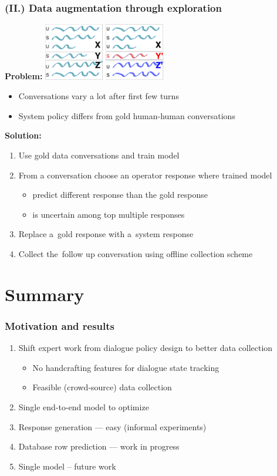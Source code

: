 \documentclass[10pt, compress,british,xcolor={svgnames,dvipsnames,x11names},trans]{beamer}
\begin{document}
\begin{frame}\frametitle{(II.) Data augmentation through exploration}
    {\bf Problem:} \hfill \includegraphics[width=0.4\textwidth]{./misunderstaning}
    \begin{itemize}
        \item Conversations vary a lot after first few turns
        \item System policy differs from gold human-human conversations
    \end{itemize}
    {\bf Solution:} \\
    \begin{enumerate}
        \item Use gold data conversations and train model   
        \item From a conversation choose an operator response where trained model
            \begin{itemize}
                \item predict different response than the gold response
                \item is uncertain among top multiple responses
            \end{itemize}
        \item Replace a~gold response with a~system response
        \item Collect the~follow up conversation using offline collection scheme  
    \end{enumerate}
\end{frame}

\section{Summary}

\begin{frame}\frametitle{Motivation and results}
    \begin{enumerate}
        \item Shift expert work from dialogue policy design to better data collection 
        \begin{itemize}
            \item No handcrafting features for dialogue state tracking~\cite{platek_recurrent_2016}
            \item Feasible (crowd-source) data collection~\cite{platek2016wochat}
        \end{itemize}
        \item Single end-to-end model to optimize
            \item Response generation --- easy (informal experiments)
            \item Database row prediction --- work in progress
            \item Single model -- future work
    \end{enumerate}
\end{frame}
\end{document}
